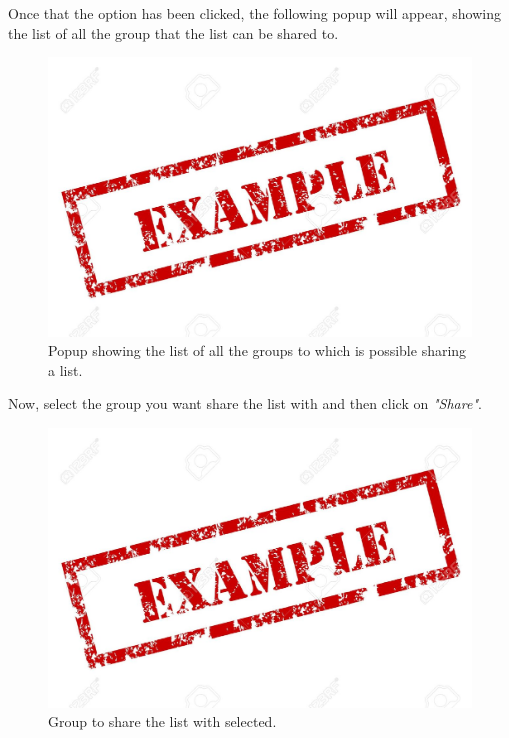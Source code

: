 Once that the option has been clicked, the following popup will appear, showing the list of all the group that the list can be shared to.

\begin{figure}[H]
  \centering 
  \includegraphics[width=\textwidth]{Sections/3-HowToUse/Images/example.jpeg}
  \caption{Popup showing the list of all the groups to which is possible sharing a list.}
\end{figure}

Now, select the group you want share the list with and then click on \textit{"Share"}.

\begin{figure}[H]
  \centering 
  \includegraphics[width=\textwidth]{Sections/3-HowToUse/Images/example.jpeg}
  \caption{Group to share the list with selected.}
\end{figure}

